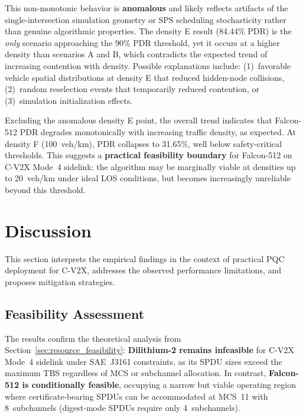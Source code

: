 \documentclass[letterpaper,journal]{IEEEtran}
\begin{document}
This non-monotonic behavior is \textbf{anomalous} and likely reflects artifacts of the single-intersection simulation geometry or SPS scheduling stochasticity rather than genuine algorithmic properties. The density E result (84.44\% PDR) is the \emph{only} scenario approaching the 90\% PDR threshold, yet it occurs at a higher density than scenarios A and B, which contradicts the expected trend of increasing contention with density. Possible explanations include: (1)~favorable vehicle spatial distributions at density E that reduced hidden-node collisions, (2)~random reselection events that temporarily reduced contention, or (3)~simulation initialization effects.

Excluding the anomalous density E point, the overall trend indicates that Falcon-512 PDR degrades monotonically with increasing traffic density, as expected. At density F (100~veh/km), PDR collapses to 31.65\%, well below safety-critical thresholds. This suggests a \textbf{practical feasibility boundary} for Falcon-512 on C-V2X Mode~4 sidelink: the algorithm may be marginally viable at densities up to 20~veh/km under ideal LOS conditions, but becomes increasingly unreliable beyond this threshold.

\section{Discussion}
\label{sec:discussion}

This section interprets the empirical findings in the context of practical PQC deployment for C-V2X, addresses the observed performance limitations, and proposes mitigation strategies.

\subsection{Feasibility Assessment}

The results confirm the theoretical analysis from Section~\ref{sec:resource_feasibility}: \textbf{Dilithium-2 remains infeasible} for C-V2X Mode~4 sidelink under SAE~J3161 constraints, as its SPDU sizes exceed the maximum TBS regardless of MCS or subchannel allocation. In contrast, \textbf{Falcon-512 is conditionally feasible}, occupying a narrow but viable operating region where certificate-bearing SPDUs can be accommodated at MCS~11 with 8~subchannels (digest-mode SPDUs require only 4~subchannels).
\end{document}
